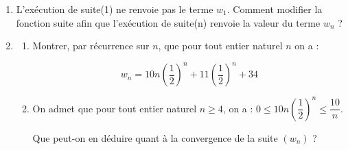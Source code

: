 \begin{enumerate}[resume]

\item L'exécution de suite(1) ne renvoie pas le terme $w_{1}$. Comment modifier la fonction suite afin que l'exécution de suite(n) renvoie la valeur du terme $w_{n}$ ?
\item 
\begin{enumerate}
	\item Montrer, par récurrence sur $n$, que pour tout entier naturel $n$ on a :

\[w_{n}=10 n\left(\dfrac{1}{2}\right)^{n}+11\left(\dfrac{1}{2}\right)^{n}+ 34\]

\item  On admet que pour tout entier naturel $n \geqslant 4$, on a : $0 \leqslant 10 n\left(\dfrac{1}{2}\right)^{n} \leqslant \dfrac{10}{n}$.

Que peut-on en déduire quant à la convergence de la suite $\left(w_{n}\right)$ ?
\end{enumerate}
\end{enumerate}

\bigskip
